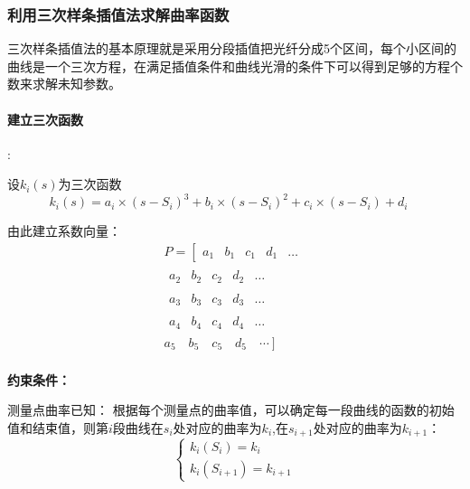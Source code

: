 \documentclass[withoutpreface,bwprint]{cumcmthesis}
\begin{document}
\subsubsection{利用三次样条插值法求解曲率函数}
三次样条插值法的基本原理就是采用分段插值把光纤分成5个区间，每个小区间的曲线是一个三次方程，在满足插值条件和曲线光滑的条件下可以得到足够的方程个数来求解未知参数。

\paragraph{建立三次函数}:

设$k_i(s)$为三次函数
\begin{equation}
k_i(s)=a_i \times\left(s-S_i\right)^3+b_i \times\left(s-S_i\right)^2+c_i \times\left(s-S_i\right)+d_i\quad
\end{equation}

由此建立系数向量：
\begin{equation}
\begin{aligned}
& P=\left[\begin{array}{llllll}
a_1 & b_1 & c_1 & d_1 & \ldots
\end{array}\right. \\
& \begin{array}{lllll}
a_2 & b_2 & c_2 & d_2 & \ldots
\end{array} \\
& \begin{array}{lllll}
a_3 & b_3 & c_3 & d_3 & \ldots
\end{array} \\
& \begin{array}{lllll}
a_4 & b_4 & c_4 & d_4 & \ldots
\end{array} \\
& \left.a_5 \quad b_5 \quad c_5 \quad d_5 \quad \cdots\right] \\
&
\end{aligned}\quad
\end{equation}

\textbf{约束条件：}

测量点曲率已知： 根据每个测量点的曲率值，可以确定每一段曲线的函数的初始值和结束值，则第$i$段曲线在$s_i$处对应的曲率为$k_i$,在$s_{i+1}$处对应的曲率为$k_{i+1}$：
\begin{equation}
\left\{\begin{array}{l}
k_i\left(S_i\right)=k_i \\
k_i\left(S_{i+1}\right)=k_{i+1}
\end{array}\right.
\end{equation}
\end{document}
